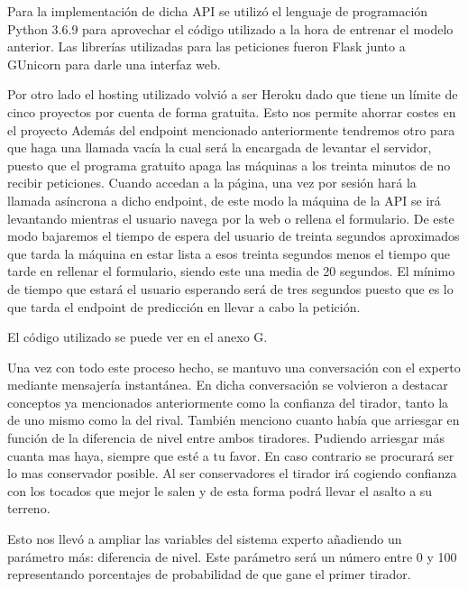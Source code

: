 Para la implementación de dicha API se utilizó el lenguaje de programación Python 3.6.9 para
aprovechar el código utilizado a la hora de entrenar el modelo anterior. Las librerías
utilizadas para las peticiones fueron Flask junto a GUnicorn para darle una interfaz web.



Por otro lado el hosting utilizado volvió a ser Heroku dado que tiene un límite de cinco
proyectos por cuenta de forma gratuita. Esto nos permite ahorrar costes en el proyecto
Además del endpoint mencionado anteriormente tendremos otro para que haga una llamada vacía
la cual será la encargada de levantar el servidor, puesto que el programa gratuito apaga
las máquinas a los treinta minutos de no recibir peticiones. Cuando accedan a la página, una
vez por sesión hará la llamada asíncrona a dicho endpoint, de este modo la máquina de la API
se irá levantando mientras el usuario navega por la web o rellena el formulario. De este modo
bajaremos el tiempo de espera del usuario de treinta segundos aproximados que tarda la máquina en
estar lista a esos treinta segundos menos el tiempo que tarde en rellenar el formulario, siendo
este una media de 20 segundos. El mínimo de tiempo que estará el usuario esperando será de tres
segundos puesto que es lo que tarda el endpoint de predicción en llevar a cabo la petición.

El código utilizado se puede ver en el anexo G.

Una vez con todo este proceso hecho, se mantuvo una conversación con el experto mediante mensajería
instantánea. En dicha conversación se volvieron a destacar conceptos ya mencionados anteriormente
como la confianza del tirador, tanto la de uno mismo como la del rival. También menciono cuanto
había que arriesgar en función de la diferencia de nivel entre ambos tiradores. Pudiendo
arriesgar más cuanta mas haya, siempre que esté a tu favor. En caso contrario se procurará ser
lo mas conservador posible. Al ser conservadores el tirador irá cogiendo confianza con los
tocados que mejor le salen y de esta forma podrá llevar el asalto a su terreno.

Esto nos llevó a ampliar las variables del sistema experto añadiendo un parámetro más: diferencia
de nivel. Este parámetro será un número entre 0 y 100 representando porcentajes de probabilidad
de que gane el primer tirador.

